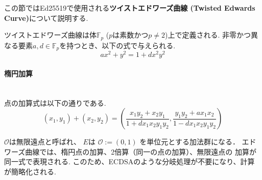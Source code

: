 この節ではEd25519で使用される\textbf{ツイストエドワーズ曲線
(Twisted Edwards Curve)}について説明する.

ツイストエドワーズ曲線は体$\mathbb{F}_p$ ($p$は素数かつ$p\neq 2$)上で定義される.
非零かつ異なる要素$a,d\in \mathbb{F}_p$を持つとき、以下の式で与えられる.
\begin{equation}
  ax^2 + y^2 = 1 + dx^2y^2
\end{equation}

\paragraph{楕円加算}\leavevmode\\
点の加算式は以下の通りである.
\begin{equation}
  (x_1,y_1)+(x_2,y_2)=(\frac{x_1y_2+x_2y_1}{1+dx_1x_2y_1y_2},\frac{y_1y_2+ax_1x_2}{1-dx_1x_2y_1y_2})
\end{equation}
\vspace{1em}

$\mathcal{O}$は無限遠点と呼ばれ、
$E$は $\mathcal{O} := (0, 1)$ を単位元とする加法群になる．
エドワーズ曲線では、楕円点の加算、2倍算（同一の点の加算）、無限遠点の
加算が同一式で表現される.
このため、ECDSAのような分岐処理が不要になり、計算が簡略化される.\\



